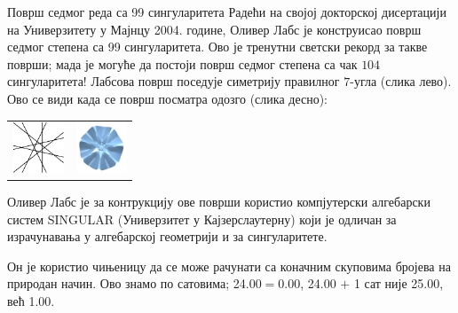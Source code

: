 \begin{surferPage}{Површ седмог реда са 99 сингуларитета}
    Радећи на својој докторској дисертацији на Универзитету у Мајнцу 2004. године, 
	Оливер Лабс је конструисао површ седмог степена са 99 сингуларитета. 
	Ово је тренутни светски рекорд за такве површи; мада је могуће да постоји површ 
	седмог степена са чак $104$ сингуларитета!  
    Лабсова површ поседује симетрију правилног $7$-угла (слика лево).
    Ово се види када се површ посматра одозго (слика десно):

    \vspace*{-0.3em}
    \begin{center}
      \begin{tabular}{c@{\qquad}c}
        \includegraphics[height=1.5cm]{./../../common/images/labsseptic1.pdf}
        &
        \includegraphics[height=1.5cm]{./../../common/images/labs_septic_von_oben}
      \end{tabular}
    \end{center}
    \vspace*{-0.3em}

    Оливер Лабс је за контрукцију ове површи користио компјутерски алгебарски систем 
    {\sc SINGULAR} (Универзитет у Кајзерслаутерну) који је одличан за израчунавања у 
	алгебарској геометрији и за сингуларитете.

    Он је користио чињеницу да се може рачунати са коначним скуповима бројева на 
    природан начин. Ово знамо по сатовима; 24.00$=$0.00, 24.00 $+$ 1 сат није
    25.00, већ 1.00.
\end{surferPage}
